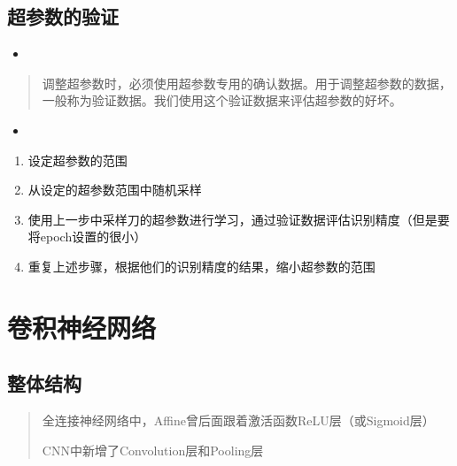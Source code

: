 \documentclass[letterpaper,10pt,english]{sphinxmanual}
\begin{document}
\section{超参数的验证}
\label{\detokenize{_u4e0e_u5b66_u4e60_u76f8_u5173_u7684_u6280_u5de7:id5}}\begin{itemize}
\item {} 

\end{itemize}
\begin{quote}

调整超参数时，必须使用超参数专用的确认数据。用于调整超参数的数据，一般称为验证数据。我们使用这个验证数据来评估超参数的好坏。
\end{quote}
\begin{itemize}
\item {} 

\end{itemize}
\begin{enumerate}
\item {} 
设定超参数的范围

\item {} 
从设定的超参数范围中随机采样

\item {} 
使用上一步中采样刀的超参数进行学习，通过验证数据评估识别精度（但是要将epoch设置的很小）

\item {} 
重复上述步骤，根据他们的识别精度的结果，缩小超参数的范围

\end{enumerate}


\chapter{卷积神经网络}
\label{\detokenize{_u5377_u79ef_u795e_u7ecf_u7f51_u7edc:id1}}\label{\detokenize{_u5377_u79ef_u795e_u7ecf_u7f51_u7edc::doc}}

\section{整体结构}
\label{\detokenize{_u5377_u79ef_u795e_u7ecf_u7f51_u7edc:id2}}\begin{quote}

全连接神经网络中，Affine曾后面跟着激活函数ReLU层（或Sigmoid层）


CNN中新增了Convolution层和Pooling层

\end{quote}
\end{document}
